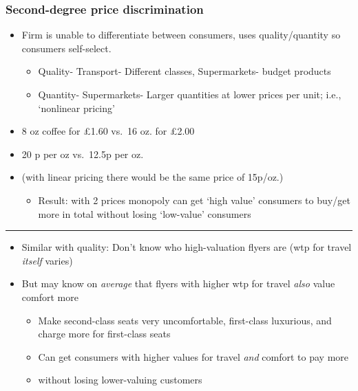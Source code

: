 \documentclass[]{article}
\providecommand{\tightlist}{%
  \setlength{\itemsep}{0pt}\setlength{\parskip}{0pt}}
\begin{document}
\hypertarget{second-degree-price-discrimination}{%
\subsubsection{Second-degree price
discrimination}\label{second-degree-price-discrimination}}

\begin{itemize}
\tightlist
\item
  Firm is unable to differentiate between consumers, uses
  quality/quantity so consumers self-select.

  \begin{itemize}
  \tightlist
  \item
    Quality- Transport- Different classes, Supermarkets- budget products
  \item
    Quantity- Supermarkets- Larger quantities at lower prices per unit;
    i.e., `nonlinear pricing'
  \end{itemize}
\end{itemize}

\begin{itemize}
\tightlist
\item
  8 oz coffee for \pounds1.60 vs.~16 oz. for \pounds2.00
\item
  20 p per oz vs.~12.5p per oz.
\item
  (with linear pricing there would be the same price of 15p/oz.)

  \begin{itemize}
  \tightlist
  \item
    Result: with 2 prices monopoly can get `high value' consumers to
    buy/get more in total without losing `low-value' consumers
  \end{itemize}
\end{itemize}

\begin{center}\rule{0.5\linewidth}{\linethickness}\end{center}

\begin{itemize}
\tightlist
\item
  Similar with quality: Don't know who high-valuation flyers are (wtp
  for travel \emph{itself} varies)
\item
  But may know on \emph{average} that flyers with higher wtp for travel
  \emph{also} value comfort more

  \begin{itemize}
  \tightlist
  \item
    Make second-class seats very uncomfortable, first-class luxurious,
    and charge more for first-class seats
  \item
    Can get consumers with higher values for travel \emph{and} comfort
    to pay more
  \item
    without losing lower-valuing customers
  \end{itemize}
\end{itemize}
\end{document}
